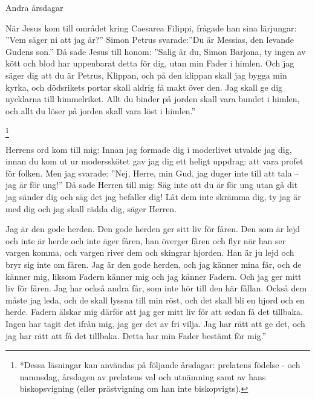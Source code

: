 \vspace{13 mm}
\begin{center}
{\Large {\color{rubrica}Andra årsdagar}}
\end{center}
\vspace{-4 mm}


{
När Jesus kom till området kring Caesarea Filippi, frågade han sina lärjungar:
”Vem säger ni att jag är?”
Simon Petrus svarade:”Du är Messias, den levande Gudens son.”
Då sade Jesus till honom: ”Salig är du, Simon Barjona, ty ingen av kött och blod har uppenbarat detta för dig, utan min Fader i himlen.
Och jag säger dig att du är Petrus, Klippan, och på den klippan skall jag bygga min kyrka, och dödsrikets portar skall aldrig få makt över den.
Jag skall ge dig nycklarna till himmelriket. Allt du binder på jorden skall vara bundet i himlen, och allt du löser på jorden skall vara löst i himlen.”}

\newpage
{}
\let\thefootnote\relax\footnote{*Dessa läsningar kan användas på följande årsdagar: prelatens födelse - och namnsdag, årsdagen av prelatens val och utnämning samt av hans biskopsvigning (eller prästvigning om han inte biskopvigts).}

{Herrens ord kom till mig:
Innan jag formade dig i moderlivet
utvalde jag dig,
innan du kom ut ur modersskötet
gav jag dig ett heligt uppdrag:
att vara profet för folken.
Men jag svarade: ”Nej, Herre, min Gud, jag duger inte till att tala – jag är för ung!” Då sade Herren till mig:
Säg inte att du är för ung
utan gå dit jag sänder dig
och säg det jag befaller dig!
Låt dem inte skrämma dig,
ty jag är med dig
och jag skall rädda dig,
säger Herren.}


{Jag är den gode herden. Den gode herden ger sitt liv för fåren.
Den som är lejd och inte är herde och inte äger fåren, han överger fåren och flyr när han ser vargen komma, och vargen river dem och skingrar hjorden.
Han är ju lejd och bryr sig inte om fåren.
Jag är den gode herden, och jag känner mina får, och de känner mig,
liksom Fadern känner mig och jag känner Fadern. Och jag ger mitt liv för fåren.
Jag har också andra får, som inte hör till den här fållan. Också dem måste jag leda, och de skall lyssna till min röst, och det skall bli en hjord och en herde.
Fadern älskar mig därför att jag ger mitt liv för att sedan få det tillbaka.
Ingen har tagit det ifrån mig, jag ger det av fri vilja. Jag har rätt att ge det, och jag har rätt att få det tillbaka. Detta har min Fader bestämt för mig.”}


